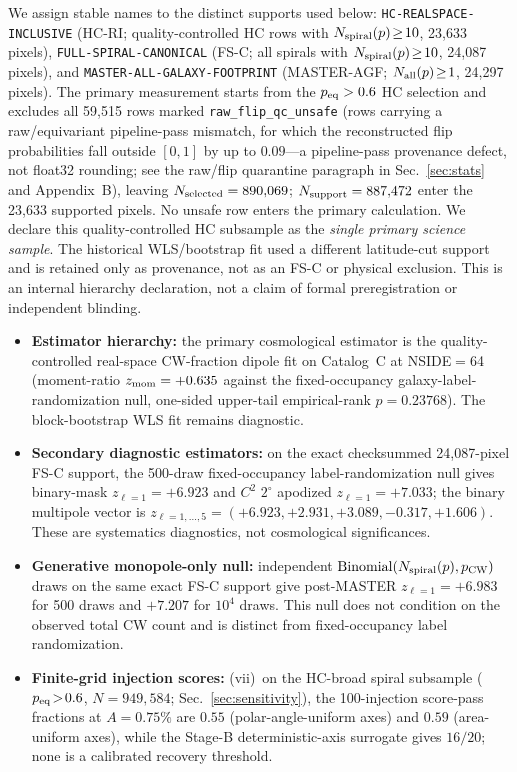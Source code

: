 \documentclass[twocolumn,linenumbers]{aastex702}
\newcommand{\HCRI}{\textsc{HC-RI}}
\newcommand{\FSC}{\textsc{FS-C}}
\newcommand{\MAGF}{\textsc{MASTER-AGF}}
\begin{document}
We assign stable names to the distinct supports used below: \texttt{HC-REALSPACE-INCLUSIVE} (\HCRI{}; quality-controlled HC rows with $N_{\rm spiral}(p)\!\geq\!10$, 23,633 pixels), \texttt{FULL-SPIRAL-CANONICAL} (\FSC{}; all spirals with $N_{\rm spiral}(p)\!\geq\!10$, 24,087 pixels), and \texttt{MASTER-ALL-GALAXY-FOOTPRINT} (\MAGF{}; $N_{\rm all}(p)\!\geq\!1$, 24,297 pixels). The primary measurement starts from the $p_{\rm eq}>0.6$ HC selection and excludes all 59,515 rows marked \texttt{raw\_flip\_qc\_unsafe} (rows carrying a raw/equivariant pipeline-pass mismatch, for which the reconstructed flip probabilities fall outside $[0,1]$ by up to $0.09$---a pipeline-pass provenance defect, not float32 rounding; see the raw/flip quarantine paragraph in Sec.~\ref{sec:stats} and Appendix~B), leaving $N_{\rm selected}=890{,}069$; $N_{\rm support}=887{,}472$ enter the 23,633 supported pixels. No unsafe row enters the primary calculation. We declare this quality-controlled HC subsample as the \emph{single primary science sample}. The historical WLS/bootstrap fit used a different latitude-cut support and is retained only as provenance, not as an \FSC{} or physical exclusion. This is an internal hierarchy declaration, not a claim of formal preregistration or independent blinding.
\begin{itemize}\setlength{\itemsep}{0pt}
\item \textbf{Estimator hierarchy:} the primary cosmological estimator is the quality-controlled real-space CW-fraction dipole fit on Catalog~C at NSIDE$=$64 (moment-ratio $z_{\rm mom}=+0.635$ against the fixed-occupancy galaxy-label-randomization null, one-sided upper-tail empirical-rank $p=0.23768$). The block-bootstrap WLS fit remains diagnostic.
\item \textbf{Secondary diagnostic estimators:} on the exact checksummed 24,087-pixel \FSC{} support, the 500-draw fixed-occupancy label-randomization null gives binary-mask $z_{\ell=1}=+6.923$ and $C^2$ $2^\circ$ apodized $z_{\ell=1}=+7.033$; the binary multipole vector is $z_{\ell=1,\ldots,5}=(+6.923,+2.931,+3.089,-0.317,+1.606)$. These are systematics diagnostics, not cosmological significances.
\item \textbf{Generative monopole-only null:} independent $\mathrm{Binomial}(N_{\rm spiral}(p),p_{\rm CW})$ draws on the same exact \FSC{} support give post-MASTER $z_{\ell=1}=+6.983$ for 500 draws and $+7.207$ for $10^4$ draws. This null does not condition on the observed total CW count and is distinct from fixed-occupancy label randomization.
\item \textbf{Finite-grid injection scores:} (vii)~on the HC-broad spiral subsample ($p_{\rm eq}\!>\!0.6$, $N\!=\!949{,}584$; Sec.~\ref{sec:sensitivity}), the 100-injection score-pass fractions at $A\!=\!0.75\%$ are $0.55$ (polar-angle-uniform axes) and $0.59$ (area-uniform axes), while the Stage-B deterministic-axis surrogate gives $16/20$; none is a calibrated recovery threshold.
\end{itemize}
\end{document}
